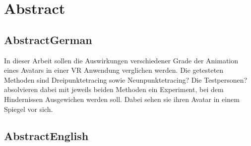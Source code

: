 \chapter{Abstract}

\section{AbstractGerman}
In dieser Arbeit sollen die Auswirkungen verschiedener Grade der Animation eines Avatars in einer VR Anwendung verglichen werden. Die getesteten Methoden sind Dreipunktetracing sowie Neunpunktetracing? Die Testpersonen? absolvieren dabei mit jeweils beiden Methoden ein Experiment, bei dem Hindernissen Ausgewichen werden soll. Dabei sehen sie ihren Avatar in einem Spiegel vor sich.


\section{AbstractEnglish}
